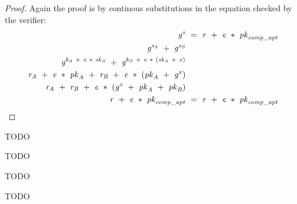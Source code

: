 \begin{proof}
    \label{prf:aptSchnorr}
    Again the proof is by continous substitutions in the equation checked by the verifier:
    \begin{align}
        \mathit{g}^{\mathit{s}} &~=~ \mathit{r} ~+~ \mathit{e} ~*~ \mathit{pk}_{\mathit{comp\_apt}} \\
        \mathit{g}^{\mathit{s}_{\mathit{A}}} ~+~ \mathit{g}^{\mathit{s}_{\mathit{B}}} & \\
        \mathit{g}^{\mathit{\mathit{k}_{\mathit{A}}} ~+~ \mathit{e} ~*~ \mathit{sk}_{\mathit{A}}} ~+~ \mathit{g}^{\mathit{\mathit{k}_{\mathit{B}}} ~+~ \mathit{e} ~*~ (\mathit{sk}_{\mathit{A}} ~+~ \mathit{x})} & \\
        \mathit{r}_{\mathit{A}} ~+~ \mathit{e} ~*~ \mathit{pk}_{\mathit{A}} ~+~ \mathit{r}_{\mathit{B}} ~+~ \mathit{e} ~*~ (\mathit{pk}_{\mathit{A}} ~+~ \mathit{g}^{\mathit{x}}) & \\
        \mathit{r}_{\mathit{A}} ~+~ \mathit{r}_{\mathit{B}} ~+~ \mathit{e} ~*~ (\mathit{g}^{\mathit{x}} ~+~ \mathit{pk}_{\mathit{A}} ~+~ \mathit{pk}_{\mathit{B}}) & \\
        \mathit{r} ~+~ \mathit{e} ~*~ \mathit{pk}_{\mathit{comp\_apt}} & ~=~ \mathit{r} ~+~ \mathit{e} ~*~ \mathit{pk}_{\mathit{comp\_apt}}
    \end{align}
\end{proof}

\begin{definition}
    TODO~\cite{aumayr2020bitcoinchannels}
\end{definition}

\begin{definition}
    TODO~\cite{aumayr2020bitcoinchannels}
\end{definition}

\begin{definition}
    TODO~\cite{aumayr2020bitcoinchannels}
\end{definition}

\begin{definition}
    TODO~\cite{aumayr2020bitcoinchannels}
\end{definition}